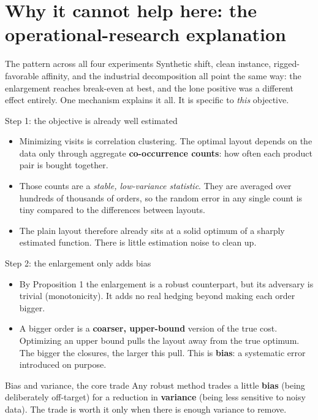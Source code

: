 \documentclass[11pt,aspectratio=169]{beamer}
\newcommand{\term}[1]{\textcolor{blue!60!black}{\textbf{#1}}}
\begin{document}
\section{Why it cannot help here: the operational-research explanation}

\begin{frame}{The pattern across all four experiments}
  Synthetic shift, clean instance, rigged-favorable affinity, and the industrial decomposition all point the same way: the enlargement reaches break-even at best, and the lone positive was a different effect entirely. One mechanism explains it all. It is specific to \emph{this} objective.
\end{frame}

\begin{frame}{Step 1: the objective is already well estimated}
  \begin{itemize}
    \item Minimizing visits is correlation clustering. The optimal layout depends on the data only through aggregate \term{co-occurrence counts}: how often each product pair is bought together.
    \item Those counts are a \emph{stable, low-variance statistic}. They are averaged over hundreds of thousands of orders, so the random error in any single count is tiny compared to the differences between layouts.
    \item The plain layout therefore already sits at a solid optimum of a sharply estimated function. There is little estimation noise to clean up.
  \end{itemize}
\end{frame}

\begin{frame}{Step 2: the enlargement only adds bias}
  \begin{itemize}
    \item By Proposition 1 the enlargement is a robust counterpart, but its adversary is trivial (monotonicity). It adds no real hedging beyond making each order bigger.
    \item A bigger order is a \term{coarser, upper-bound} version of the true cost. Optimizing an upper bound pulls the layout away from the true optimum. The bigger the closures, the larger this pull. This is \term{bias}: a systematic error introduced on purpose.
  \end{itemize}
  \begin{block}{Bias and variance, the core trade}
  Any robust method trades a little \term{bias} (being deliberately off-target) for a reduction in \term{variance} (being less sensitive to noisy data). The trade is worth it only when there is enough variance to remove.
  \end{block}
\end{frame}
\end{document}
